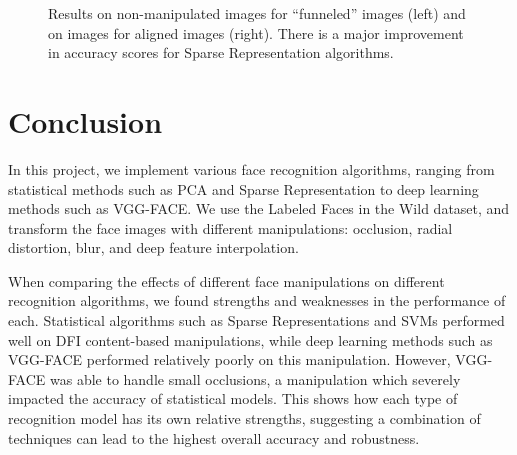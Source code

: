 \documentclass[pageno]{cos429}
\begin{document}
\begin{figure}[ht]
\centering
{}
\caption{Results on non-manipulated images for ``funneled'' images (left) and on images for aligned images (right). There is a major improvement in accuracy scores for Sparse Representation algorithms.}
\label{fig:results_alignment}
\end{figure}

\section{Conclusion}
In this project, we implement various face recognition algorithms, ranging from statistical methods such as PCA and Sparse Representation to deep learning methods such as VGG-FACE. We use the Labeled Faces in the Wild dataset, and transform the face images with different manipulations: occlusion, radial distortion, blur, and deep feature interpolation. 

When comparing the effects of different face manipulations on different recognition algorithms, we found strengths and weaknesses in the performance of each. Statistical algorithms such as Sparse Representations and SVMs performed well on DFI content-based manipulations, while deep learning methods such as VGG-FACE performed relatively poorly on this manipulation. However, VGG-FACE was able to handle small occlusions, a manipulation which severely impacted the accuracy of statistical models. This shows how each type of recognition model has its own relative strengths, suggesting a combination of techniques can lead to the highest overall accuracy and robustness.
\end{document}
